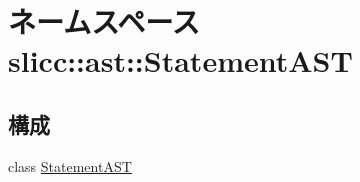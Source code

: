 \hypertarget{namespaceslicc_1_1ast_1_1StatementAST}{
\section{ネームスペース slicc::ast::StatementAST}
\label{namespaceslicc_1_1ast_1_1StatementAST}
}
\subsection*{構成}
\begin{DoxyCompactItemize}
\item 
class \hyperlink{classslicc_1_1ast_1_1StatementAST_1_1StatementAST}{StatementAST}
\end{DoxyCompactItemize}
